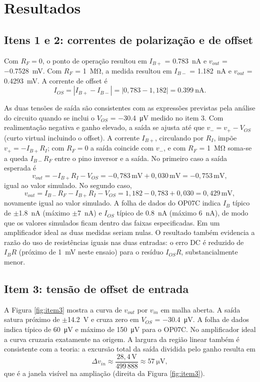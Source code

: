 \section{Resultados}
\label{sec:resultados}

\subsection{Itens 1 e 2: correntes de polarização e de offset}

Com $R_F = 0$, o ponto de operação resultou em $I_{B+}$ =
\SI{0.783}{\nano\ampere} e $v_{out}$ = \SI{-0.7528}{\milli\volt}. Com
$R_F$ = \SI{1}{\mega\ohm}, a medida resultou em $I_{B-}$ =
\SI{1.182}{\nano\ampere} e $v_{out}$ = \SI{0.4293}{\milli\volt}. A
corrente de offset é
\[
  I_{OS} = |I_{B+} - I_{B-}| = |0{,}783 - 1{,}182| = \SI{0.399}{\nano\ampere}.
\]

As duas tensões de saída são consistentes com as expressões previstas
pela análise do circuito quando se inclui o $V_{OS}$ =
\SI{-30.4}{\micro\volt} medido no item 3. Com realimentação negativa e
ganho elevado, a saída se ajusta até que $v_- = v_+ - V_{OS}$ (curto
virtual incluindo o offset). A corrente $I_{B+}$, circulando por $R_I$,
impõe $v_+ = -I_{B+}R_I$; com $R_F = 0$ a saída coincide com $v_-$, e
com $R_F$ = \SI{1}{\mega\ohm} soma-se a queda $I_{B-}R_F$ entre o pino
inversor e a saída. No primeiro caso a saída esperada é
\[
  v_{out} = -I_{B+}R_I - V_{OS}
          = -0{,}783\,\mathrm{mV} + 0{,}030\,\mathrm{mV}
          = -0{,}753\,\mathrm{mV},
\]
igual ao valor simulado. No segundo caso,
\[
  v_{out} = I_{B-}R_F - I_{B+}R_I - V_{OS}
          = 1{,}182 - 0{,}783 + 0{,}030
          = 0{,}429\,\mathrm{mV},
\]
novamente igual ao valor simulado. A folha de dados do OP07C indica
$I_B$ típico de $\pm$\SI{1.8}{\nano\ampere} (máximo
$\pm$\SI{7}{\nano\ampere}) e $I_{OS}$ típico de \SI{0.8}{\nano\ampere}
(máximo \SI{6}{\nano\ampere}), de modo que os valores simulados ficam
dentro das faixas especificadas. Em um amplificador ideal as duas
medidas seriam nulas. O resultado também evidencia a razão do uso de
resistências iguais nas duas entradas: o erro DC é reduzido de $I_B R$
(próximo de \SI{1}{\milli\volt} neste ensaio) para o resíduo $I_{OS}R$,
substancialmente menor.

\subsection{Item 3: tensão de offset de entrada}

A Figura \ref{fig:item3} mostra a curva de $v_{out}$ por $v_{in}$ em
malha aberta. A saída satura próximo de $\pm$\SI{14.2}{\volt} e cruza zero
em $V_{OS}$ = \SI{-30.4}{\micro\volt}. A folha de dados indica típico de
\SI{60}{\micro\volt} e máximo de \SI{150}{\micro\volt} para o OP07C. No
amplificador ideal a curva cruzaria exatamente na origem. A largura da
região linear também é consistente com a teoria: a excursão total da
saída dividida pelo ganho resulta em
\[
  \Delta v_{in} \approx \frac{28{,}4\,\mathrm{V}}{499\,888}
  \approx \SI{57}{\micro\volt},
\]
que é a janela visível na ampliação (direita da Figura \ref{fig:item3}).

